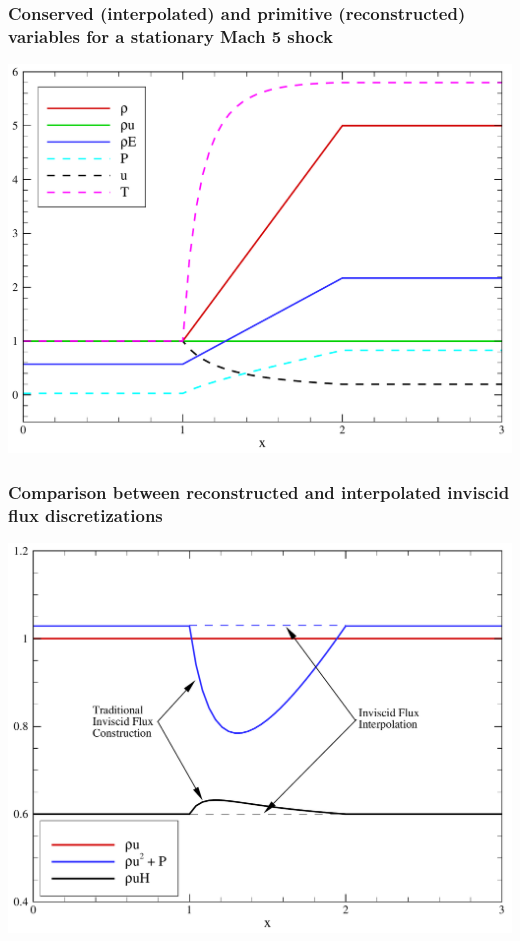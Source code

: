 \documentclass[compress,11pt]{beamer}
\begin{document}
\frame
{
  \frametitle{\scriptsize Conserved (interpolated) and primitive (reconstructed) variables for a stationary Mach 5 shock}
  \centerline{\includegraphics[width=.85\textwidth]{figures/comp_ns_interpolation/primitive_vars}}
}

\frame
{
  \frametitle{\scriptsize Comparison between reconstructed and interpolated inviscid flux discretizations}

  \centerline{\includegraphics[width=.85\textwidth]{figures/comp_ns_interpolation/inv_flux}}
}
\end{document}
